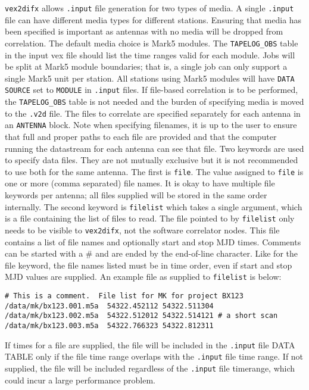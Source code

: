 {\tt vex2difx} allows {\tt .input} file generation for two types of media.
A single {\tt .input} file can have different media types for different stations. 
Ensuring that media has been specified is important as antennas with no media will be dropped from correlation.
The default media choice is Mark5 modules.
The {\tt TAPELOG\_OBS} table in the input vex file should list the time ranges valid for each module.
Jobs will be split at Mark5 module boundaries; that is, a single job can only support a single Mark5 unit per station.
All stations using Mark5 modules will have {\tt DATA SOURCE} set to {\tt MODULE} in {\tt .input} files. 
If file-based correlation is to be performed, the {\tt TAPELOG\_OBS} table is not needed and the burden of specifying media is moved to the {\tt .v2d} file. 
The files to correlate are specified separately for each antenna in an {\tt ANTENNA} block.
Note when specifying filenames, it is up to the user to ensure that full and proper paths to each file are provided and that the computer running the datastream for each antenna can see that file.
Two keywords are used to specify data files.
They are not mutually exclusive but it is not recommended to use both for the same antenna.
The first is {\tt file}.
The value assigned to {\tt file} is one or more (comma separated) file names.
It is okay to have multiple file keywords per antenna; all files supplied will be stored in the same order internally.
The second keyword is {\tt filelist} which takes a single argument, which is a file containing the list of files to read.
The file pointed to by {\tt filelist} only needs to be visible to {\tt vex2difx}, not the software correlator nodes. 
This file contains a list of file names and optionally start and stop MJD times.
Comments can be started with a \# and are ended by the end-of-line character.
Like for the file keyword, the file names listed must be in time order, even if start and stop MJD values are supplied.
An example file as supplied to {\tt filelist} is below:

\begin{verbatim}
# This is a comment.  File list for MK for project BX123
/data/mk/bx123.001.m5a  54322.452112 54322.511304
/data/mk/bx123.002.m5a  54322.512012 54322.514121 # a short scan
/data/mk/bx123.003.m5a  54322.766323 54322.812311 
\end{verbatim}

If times for a file are supplied, the file will be included in the {\tt .input} file DATA TABLE only if the file time range overlaps with the {\tt .input} file time range.
If not supplied, the file will be included regardless of the {\tt .input} file timerange, which could incur a large performance problem.

